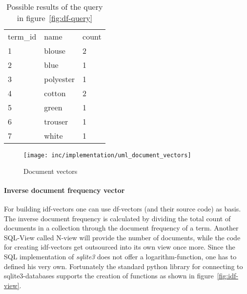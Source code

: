 \begin{table}
    \center
    \begin{tabular}{ l | l | l } 
        \rowcolor{LightSlateGrey}
        \multicolumn{3}{ c }{\textbf{df}}\\\hline
        term\_id    & name      & count\\\hline
        1           & blouse    & 2\\
        2           & blue      & 1\\
        3           & polyester & 1\\
        4           & cotton    & 2\\
        5           & green     & 1\\
        6           & trouser   & 1\\
        7           & white     & 1\\
    \end{tabular}
    \caption{Possible results of the query in figure~\ref{fig:df-query}}
    \label{tab:df-query-result}
\end{table}

\begin{figure}[h]
    \center
    \texttt{[image: inc/implementation/uml\_document\_vectors]}
    \caption{Document vectors}
    \label{fig:uml-document-vectors}
\end{figure}

\paragraph{Inverse document frequency vector}
For building idf-vectors one can use df-vectors (and their source code) as basis.
The inverse document frequency is calculated by dividing the total count of documents in a collection through the document frequency of a term.
Another SQL-View called N-view will provide the number of documents, while the code for creating idf-vectors get outsourced into its own view once more.
Since the SQL implementation of \textit{sqlite3} does not offer a logarithm-function, one has to defined his very own.
Fortunately the standard python library for connecting to sqlite3-databases supports the creation of functions as shown in figure~\ref{fig:idf-view}.


